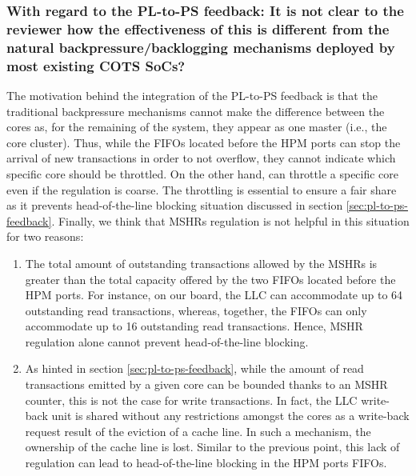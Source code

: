 
        \subsubsection{With regard to the PL-to-PS feedback: It is not clear to the reviewer how the effectiveness of this is different from the natural backpressure/backlogging mechanisms deployed by most existing COTS SoCs?}
            The motivation behind the integration of the PL-to-PS feedback is that the traditional backpressure mechanisms cannot make the difference between the cores as, for the remaining of the system, they appear as one master (i.e., the core cluster).
            Thus, while the FIFOs located before the HPM ports can stop the arrival of new transactions in order to not overflow, they cannot indicate which specific core should be throttled. On the other hand, \schim can throttle a specific core even if the regulation is coarse.
            The throttling is essential to ensure a fair share as it prevents head-of-the-line blocking situation discussed in section \ref{sec:pl-to-ps-feedback}.
            Finally, we think that MSHRs regulation is not helpful in this situation for two reasons:
            \begin{enumerate}
                \item The total amount of outstanding transactions allowed by the MSHRs is greater than the total capacity offered by the two FIFOs located before the HPM ports. For instance, on our board, the LLC can accommodate up to 64 outstanding read transactions, whereas, together, the FIFOs can only accommodate up to 16 outstanding read transactions. Hence, MSHR regulation alone cannot prevent head-of-the-line blocking.
                \item As hinted in section \ref{sec:pl-to-ps-feedback}, while the amount of read transactions emitted by a given core can be bounded thanks to an MSHR counter, this is not the case for write transactions. In fact, the LLC write-back unit is shared without any restrictions amongst the cores as a write-back request result of the eviction of a cache line. In such a mechanism, the ownership of the cache line is lost. Similar to the previous point, this lack of regulation can lead to head-of-the-line blocking in the HPM ports FIFOs.
            \end{enumerate}

